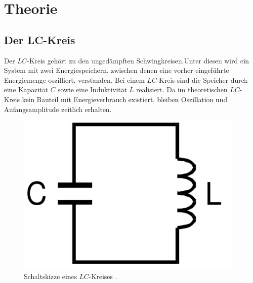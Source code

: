\section{Theorie}
\label{sec:Theorie}


\subsection{Der LC-Kreis}
Der $LC$-Kreis gehört zu den ungedämpften Schwingkreisen.Unter diesen wird
 ein System mit zwei Energiespeichern, zwischen denen eine vorher eingeführte Energiemenge
  oszilliert, verstanden. Bei einem $LC$-Kreis sind die Speicher durch eine Kapazität $C$ sowie
  eine Induktivität $L$ realisiert. Da im theoretischen $LC$-Kreis kein Bauteil mit Energieverbrauch
   existiert, bleiben Oszillation und Anfangsamplitude zeitlich erhalten.

   \begin{figure}[H]
     \centering
     \includegraphics[width=\linewidth-300pt,height=\textheight-300pt,keepaspectratio]{content/CL.png}
     \caption{Schaltskizze eines $LC$-Kreises \cite{V354}.}
     \label{fig:CL_Kreis}
   \end{figure}

